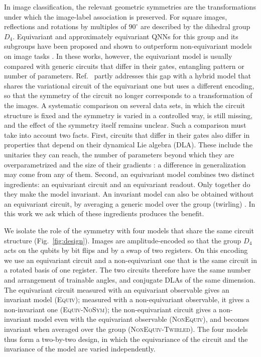 \documentclass[aps,pra,reprint,superscriptaddress,longbibliography]{revtex4-2}
\newcommand{\Equiv}{\textsc{Equiv}}
\newcommand{\NonEquiv}{\textsc{NonEquiv}}
\newcommand{\Twirled}{\textsc{NonEquiv-Twirled}}
\newcommand{\NoSym}{\textsc{Equiv-NoSym}}
\begin{document}
In image classification, the relevant geometric symmetries are the transformations under which the image-label association is preserved. For square images, reflections and rotations by multiples of $90^\circ$ are described by the dihedral group $D_4$. Equivariant and approximately equivariant QNNs for this group and its subgroups have been proposed and shown to outperform non-equivariant models on image tasks \cite{chang2023equivariant, west2023reflection, west2024provably, PhysRevResearch.7.013082}. In these works, however, the equivariant model is usually compared with generic circuits that differ in their gates, entangling pattern or number of parameters. Ref.~\cite{west2023reflection} partly addresses this gap with a hybrid model that shares the variational circuit of the equivariant one but uses a different encoding, so that the symmetry of the circuit no longer corresponds to a transformation of the images. A systematic comparison on several data sets, in which the circuit structure is fixed and the symmetry is varied in a controlled way, is still missing, and the effect of the symmetry itself remains unclear.
Such a comparison must take into account two facts. First, circuits that differ in their gates also differ in properties that depend on their dynamical Lie algebra (DLA). These include the unitaries they can reach, the number of parameters beyond which they are overparametrized \cite{larocca2023theory} and the size of their gradients \cite{ragone2024lie, fontana2024characterizing}: a difference in generalization may come from any of them. Second, an equivariant model combines two distinct ingredients: an equivariant circuit and an equivariant readout. Only together do they make the model invariant. An invariant model can also be obtained without an equivariant circuit, by averaging a generic model over the group (twirling) \cite{meyer2023exploiting, nguyen2024theory}. In this work we ask which of these ingredients produces the benefit.

We isolate the role of the symmetry with four models that share the same circuit structure (Fig.~\ref{fig:design}). Images are amplitude-encoded so that the group $D_4$ acts on the qubits by bit flips and by a swap of two registers. On this encoding we use an equivariant circuit \citep{chang2023equivariant} and a non-equivariant one that is the same circuit in a rotated basis of one register. The two circuits therefore have the same number and arrangement of trainable angles, and conjugate DLAs of the same dimension. The equivariant circuit measured with an equivariant observable gives an invariant model (\Equiv); measured with a non-equivariant observable, it gives a non-invariant one (\NoSym); the non-equivariant circuit gives a non-invariant model even with the equivariant observable (\NonEquiv), and becomes invariant when averaged over the group (\Twirled). The four models thus form a two-by-two design, in which the equivariance of the circuit and the invariance of the model are varied independently.
\end{document}
